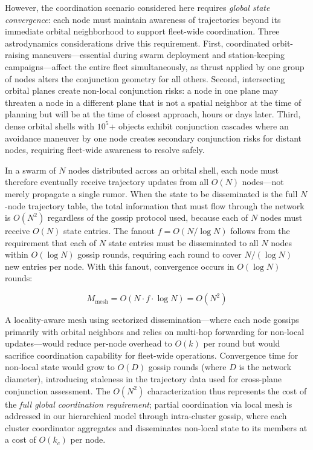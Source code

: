 \documentclass[journal]{IEEEtran}
\begin{document}
However, the coordination scenario considered here requires \emph{global state convergence}: each node must maintain awareness of trajectories beyond its immediate orbital neighborhood to support fleet-wide coordination. Three astrodynamics considerations drive this requirement. First, coordinated orbit-raising maneuvers---essential during swarm deployment and station-keeping campaigns---affect the entire fleet simultaneously, as thrust applied by one group of nodes alters the conjunction geometry for all others. Second, intersecting orbital planes create non-local conjunction risks: a node in one plane may threaten a node in a different plane that is not a spatial neighbor at the time of planning but will be at the time of closest approach, hours or days later. Third, dense orbital shells with $10^5$+ objects exhibit conjunction cascades where an avoidance maneuver by one node creates secondary conjunction risks for distant nodes, requiring fleet-wide awareness to resolve safely.

In a swarm of $N$ nodes distributed across an orbital shell, each node must therefore eventually receive trajectory updates from all $O(N)$ nodes---not merely propagate a single rumor. When the state to be disseminated is the full $N$-node trajectory table, the total information that must flow through the network is $O(N^2)$ regardless of the gossip protocol used, because each of $N$ nodes must receive $O(N)$ state entries. The fanout $f = O(N / \log N)$ follows from the requirement that each of $N$ state entries must be disseminated to all $N$ nodes within $O(\log N)$ gossip rounds, requiring each round to cover $N / (\log N)$ new entries per node. With this fanout, convergence occurs in $O(\log N)$ rounds:

\begin{equation}
    M_{\text{mesh}} = O(N \cdot f \cdot \log N) = O(N^2)
    \label{eq:mesh_messages}
\end{equation}

A locality-aware mesh using sectorized dissemination---where each node gossips primarily with orbital neighbors and relies on multi-hop forwarding for non-local updates---would reduce per-node overhead to $O(k)$ per round but would sacrifice coordination capability for fleet-wide operations. Convergence time for non-local state would grow to $O(D)$ gossip rounds (where $D$ is the network diameter), introducing staleness in the trajectory data used for cross-plane conjunction assessment. The $O(N^2)$ characterization thus represents the cost of the \emph{full global coordination requirement}; partial coordination via local mesh is addressed in our hierarchical model through intra-cluster gossip, where each cluster coordinator aggregates and disseminates non-local state to its members at a cost of $O(k_c)$ per node.
\end{document}
